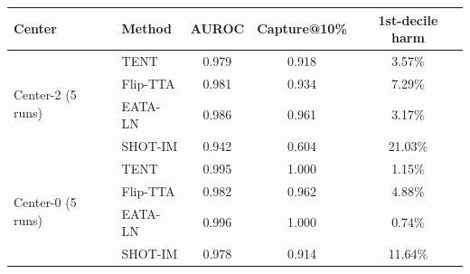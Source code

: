 \footnotesize
\setlength{\tabcolsep}{2.5pt}
\begin{tabular}{llccc}
\toprule
Center & Method & AUROC & Capture@10\% & 1st-decile harm \\
\midrule
\multirow{4}{*}{Center-2 (5 runs)} & TENT & 0.979 & 0.918 & 3.57\% \\
 & Flip-TTA & 0.981 & 0.934 & 7.29\% \\
 & EATA-LN & 0.986 & 0.961 & 3.17\% \\
 & SHOT-IM & 0.942 & 0.604 & 21.03\% \\
\midrule
\multirow{4}{*}{Center-0 (5 runs)} & TENT & 0.995 & 1.000 & 1.15\% \\
 & Flip-TTA & 0.982 & 0.962 & 4.88\% \\
 & EATA-LN & 0.996 & 1.000 & 0.74\% \\
 & SHOT-IM & 0.978 & 0.914 & 11.64\% \\
\bottomrule
\end{tabular}
